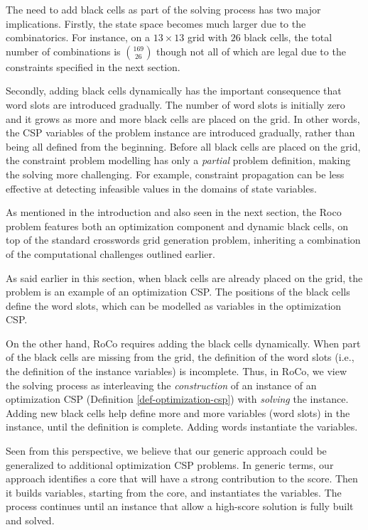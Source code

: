 The need to add black cells as part of the solving process has two 
major implications.
Firstly, the state space becomes much larger due to the combinatorics.
For instance, on a $13 \times 13$ grid with $26$
black cells, the total number of combinations is $169 \choose 26$ though
not all of which are legal due to the constraints
specified in the next section.

Secondly, adding black cells dynamically has the important consequence that
word slots are introduced gradually.
The number of word slots is initially zero and it grows
as more and more black cells are placed on the grid.
In other words, the CSP variables of the problem instance are introduced gradually,
rather than being all defined from the beginning.
Before all black cells are placed on the grid, 
the constraint problem modelling has only a \emph{partial} problem definition,
making the solving more challenging.
For example, constraint propagation can be less effective
at detecting infeasible values in the domains of state variables.

As mentioned in the introduction and also seen in the next section, the {\sc Roco} problem features both 
an optimization component and dynamic black cells, on top of the
standard crosswords grid generation problem,
inheriting a combination of 
the computational challenges outlined earlier.

As said earlier in this section,
when black cells are already placed on the grid,
the problem is an example of an optimization CSP.
The positions of the black cells define the word slots,
which can be modelled as variables in the optimization CSP.

On the other hand, {\sc RoCo} requires adding the black cells dynamically.
When part of the black cells are missing from the grid, the definition
of the word slots (i.e., the definition of the instance variables) is incomplete.
Thus, in {\sc RoCo}, we view the solving process as
interleaving the \emph{construction} of an instance of an optimization CSP
(Definition \ref{def-optimization-csp}) with \emph{solving} the instance.
Adding new black cells help define more and more variables (word slots) in the instance,
until the definition is complete.
Adding words instantiate the variables.

Seen from this perspective, we believe that our generic approach could be generalized
to additional optimization CSP problems. In generic terms, our approach identifies a core
that will have a strong contribution to the score.
Then it builds variables, starting from the core, and instantiates the variables.
The process continues until an instance that allow a high-score solution is fully built and solved.

